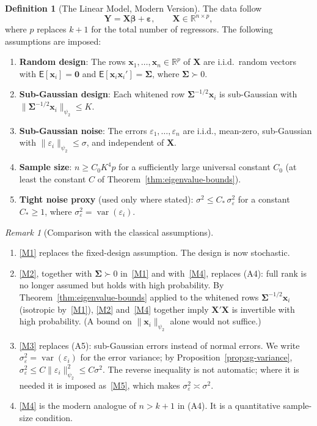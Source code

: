 \documentclass[14pt]{extarticle}
\theoremstyle{plain}
\theoremstyle{definition}
\newtheorem{definition}{Definition}[section]
\theoremstyle{remark}
\newtheorem*{remark}{Remark}
\newcommand\expc{\mathsf{E}}
\DeclareMathOperator\var{var}
\newcommand{\bX}{\mathbf{X}}
\newcommand{\bY}{\mathbf{Y}}
\newcommand{\bx}{\mathbf{x}}
\def\bb{\boldsymbol{\beta}}
\newcommand{\be}{\boldsymbol{\varepsilon}}
\newcommand{\bzero}{\mathbf{0}}
\newcommand{\Real}{\mathbb{R}}
\newcommand{\bSigma}{\boldsymbol{\Sigma}}
\begin{document}
\begin{definition}[The Linear Model, Modern Version]\label{def:modern-model}
The data follow
\begin{equation}\label{eq:modern-model}
\bY = \bX\bb + \be, \qquad \bX \in \Real^{n \times p},
\end{equation}
where $p$ replaces $k+1$ for the total number of regressors. The following assumptions are imposed:
\begin{enumerate}[label=\textup{(M\arabic*)}]
\item\label{M1} \textbf{Random design}: The rows $\bx_1, \ldots, \bx_n \in \Real^p$ of $\bX$ are i.i.d.\ random vectors with $\expc[\bx_i] = \bzero$ and $\expc[\bx_i\bx_i'] = \bSigma$, where $\bSigma \succ 0$.
\item\label{M2} \textbf{Sub-Gaussian design}: Each whitened row $\bSigma^{-1/2}\bx_i$ is sub-Gaussian with $\|\bSigma^{-1/2}\bx_i\|_{\psi_2} \leqslant K$.
\item\label{M3} \textbf{Sub-Gaussian noise}: The errors $\varepsilon_1, \ldots, \varepsilon_n$ are i.i.d., mean-zero, sub-Gaussian with $\|\varepsilon_i\|_{\psi_2} \leqslant \sigma$, and independent of $\bX$.
\item\label{M4} \textbf{Sample size}: $n \geqslant C_0 K^4 p$ for a sufficiently large universal constant $C_0$ (at least the constant $C$ of Theorem~\ref{thm:eigenvalue-bounds}).
\item\label{M5} \textbf{Tight noise proxy} (used only where stated): $\sigma^2 \leqslant C_*\,\sigma_\varepsilon^2$ for a constant $C_* \geqslant 1$, where $\sigma_\varepsilon^2 = \var(\varepsilon_i)$.
\end{enumerate}
\end{definition}

\begin{remark}[Comparison with the classical assumptions]
\leavevmode
\begin{enumerate}[label=\textup{(\arabic*)}]
\item \ref{M1} replaces the fixed-design assumption. The design is now stochastic.
\item \ref{M2}, together with $\bSigma \succ 0$ in~\ref{M1} and with~\ref{M4}, replaces (A4): full rank is no longer assumed but holds with high probability. By Theorem~\ref{thm:eigenvalue-bounds} applied to the whitened rows $\bSigma^{-1/2}\bx_i$ (isotropic by~\ref{M1}), \ref{M2} and~\ref{M4} together imply $\bX'\bX$ is invertible with high probability. (A bound on $\|\bx_i\|_{\psi_2}$ alone would not suffice.)
\item \ref{M3} replaces (A5): sub-Gaussian errors instead of normal errors. We write $\sigma_\varepsilon^2 = \var(\varepsilon_i)$ for the error variance; by Proposition~\ref{prop:sg-variance}, $\sigma_\varepsilon^2 \leqslant C\|\varepsilon_i\|_{\psi_2}^2 \leqslant C\sigma^2$. The reverse inequality is not automatic; where it is needed it is imposed as~\ref{M5}, which makes $\sigma_\varepsilon^2 \asymp \sigma^2$.
\item \ref{M4} is the modern analogue of $n > k + 1$ in (A4). It is a quantitative sample-size condition.
\end{enumerate}
\end{remark}
\end{document}
